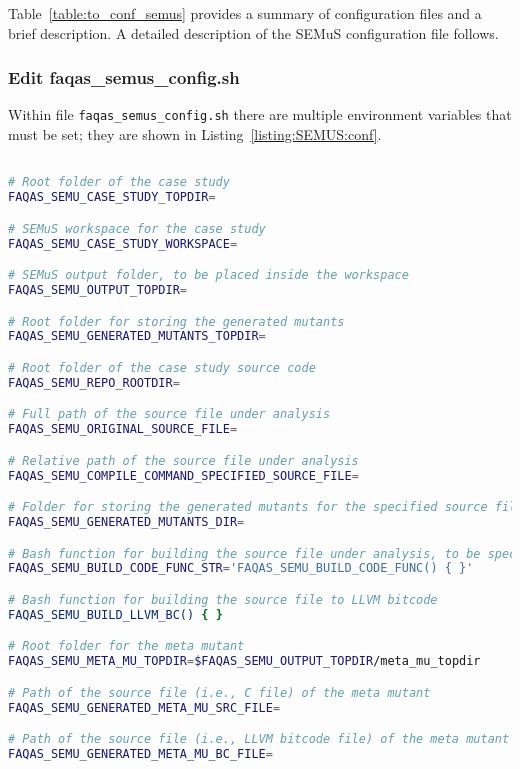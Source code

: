 

Table~\ref{table:to_conf_semus} provides a summary of \SEMUS configuration files and a brief description. A detailed description of the SEMuS configuration file follows.


\subsubsection{Edit faqas\_semus\_config.sh}

Within file \texttt{faqas\_semus\_config.sh} there are multiple environment variables that must be set; they are shown in Listing~\ref{listing:SEMUS:conf}.

\begin{lstlisting}[language=bash,label=listing:SEMUS:conf,caption=faqas\_semus\_conf.sh file.]

# Root folder of the case study
FAQAS_SEMU_CASE_STUDY_TOPDIR=

# SEMuS workspace for the case study
FAQAS_SEMU_CASE_STUDY_WORKSPACE=

# SEMuS output folder, to be placed inside the workspace
FAQAS_SEMU_OUTPUT_TOPDIR=

# Root folder for storing the generated mutants
FAQAS_SEMU_GENERATED_MUTANTS_TOPDIR=

# Root folder of the case study source code
FAQAS_SEMU_REPO_ROOTDIR=

# Full path of the source file under analysis
FAQAS_SEMU_ORIGINAL_SOURCE_FILE=

# Relative path of the source file under analysis
FAQAS_SEMU_COMPILE_COMMAND_SPECIFIED_SOURCE_FILE=

# Folder for storing the generated mutants for the specified source file
FAQAS_SEMU_GENERATED_MUTANTS_DIR=

# Bash function for building the source file under analysis, to be specified in string format
FAQAS_SEMU_BUILD_CODE_FUNC_STR='FAQAS_SEMU_BUILD_CODE_FUNC() { }'

# Bash function for building the source file to LLVM bitcode
FAQAS_SEMU_BUILD_LLVM_BC() { }

# Root folder for the meta mutant
FAQAS_SEMU_META_MU_TOPDIR=$FAQAS_SEMU_OUTPUT_TOPDIR/meta_mu_topdir

# Path of the source file (i.e., C file) of the meta mutant
FAQAS_SEMU_GENERATED_META_MU_SRC_FILE=

# Path of the source file (i.e., LLVM bitcode file) of the meta mutant
FAQAS_SEMU_GENERATED_META_MU_BC_FILE=


\end{lstlisting}
